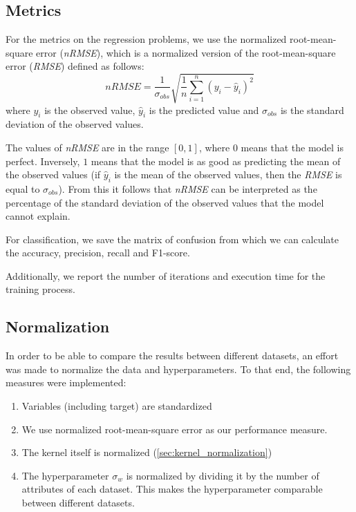 
\subsection{Metrics}
\label{sec:metrics}

For the metrics on the regression problems,
we use the normalized root-mean-square error (\emph{nRMSE}),
which is a normalized version of the root-mean-square error (\emph{RMSE})
defined as follows:
\begin{equation}
    nRMSE = \frac{1}{\sigma_{obs}}\sqrt{\frac{1}{n}\sum_{i=1}^n (y_i - \hat{y}_i)^2}
\end{equation}
where $y_i$ is the observed value, $\hat{y}_i$ is the predicted value and
$\sigma_{obs}$ is the standard deviation of the observed values.

The values of \emph{nRMSE} are in the range $[0, 1]$, where $0$ means that the
model is perfect. Inversely, $1$ means that the model is as good as predicting
the mean of the observed values (if $\hat{y}_i$ is the mean of the observed
values, then the \emph{RMSE} is equal to $\sigma_{obs}$). From this it follows
that \emph{nRMSE} can be interpreted as the percentage of the standard deviation
of the observed values that the model cannot explain.

For classification, we save the matrix of confusion from which we
can calculate the accuracy, precision, recall and F1-score.

Additionally, we report the number of iterations and execution time for the
training process.

\subsection{Normalization}%
\label{sec:normalization}

In order to be able to compare the results between different datasets, an effort
was made to normalize the data and hyperparameters. To that end, the following
measures were implemented:

\begin{enumerate}
    \item Variables (including target) are standardized
    \item We use normalized root-mean-square error as our performance
          measure.
    \item The kernel itself is normalized (\cref{sec:kernel_normalization})
    \item The hyperparameter $\sigma_w$ is normalized by dividing it by the
          number of attributes of each dataset. This makes the hyperparameter
          comparable between different datasets.
\end{enumerate}

